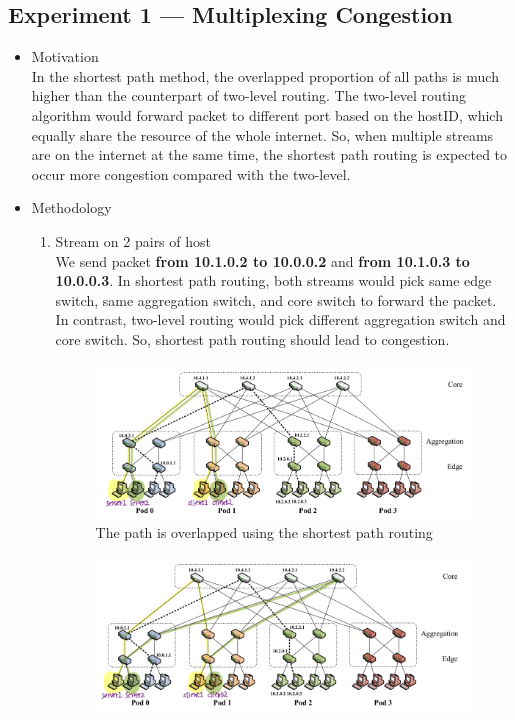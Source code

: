 \documentclass[a4paper,11pt]{article}
\begin{document}
\subsection{Experiment 1 — Multiplexing Congestion}
\begin{itemize}
    \item Motivation \\
    In the shortest path method, the overlapped proportion of all paths is much higher than the counterpart of two-level routing. The two-level routing algorithm would forward packet to different port based on the hostID, which equally share the resource of the whole internet. So, when multiple streams are on the internet at the same time, the shortest path routing is expected to occur more congestion compared with the two-level.
    \item Methodology
    \begin{enumerate}
        \item Stream on 2 pairs of host \\
        We send packet \textbf{from 10.1.0.2 to 10.0.0.2} and \textbf{from 10.1.0.3 to 10.0.0.3}.  In shortest path routing, both streams would pick same edge switch, same aggregation switch, and core switch to forward the packet.  In contrast, two-level routing would pick different aggregation switch and core switch.  So, shortest path routing should lead to congestion.
        \begin{figure}[htbp]
        \centering
        \centering
        \includegraphics[width=14cm]{sprouting.jpeg}
        \caption{The path is overlapped using the shortest path routing}
        \label{fig:sp}
        \end{figure}
        \begin{figure}[htbp]
        \centering
        \includegraphics[width=14cm]{ftrouting.jpeg}

\end{figure}
\end{enumerate}
\end{itemize}
\end{document}
